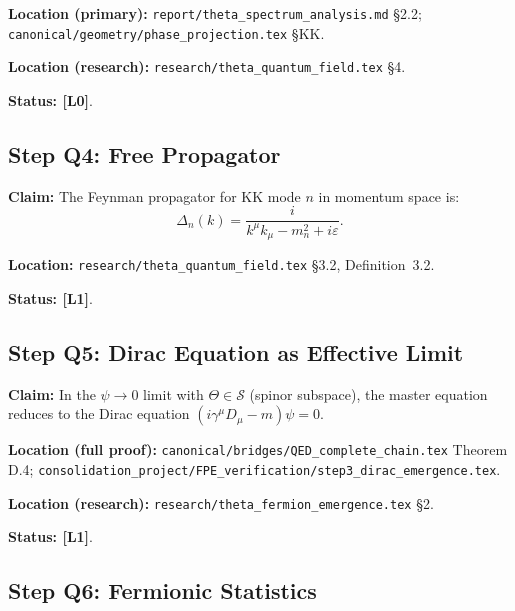 \textbf{Location (primary):} \texttt{report/theta\_spectrum\_analysis.md} §2.2;
\texttt{canonical/geometry/phase\_projection.tex} §KK.

\textbf{Location (research):} \texttt{research/theta\_quantum\_field.tex} §4.

\textbf{Status: [L0]}.

\subsection{Step Q4: Free Propagator}

\textbf{Claim:} The Feynman propagator for KK mode $n$ in momentum space is:
\begin{equation}
  \Delta_n(k) = \frac{i}{k^\mu k_\mu - m_n^2 + i\varepsilon}.
\end{equation}

\textbf{Location:} \texttt{research/theta\_quantum\_field.tex} §3.2,
Definition~3.2.

\textbf{Status: [L1]}.

\subsection{Step Q5: Dirac Equation as Effective Limit}

\textbf{Claim:} In the $\psi\to 0$ limit with $\Theta\in\mathcal{S}$
(spinor subspace), the master equation reduces to the Dirac equation
$(i\gamma^\mu D_\mu - m)\psi = 0$.

\textbf{Location (full proof):}
\texttt{canonical/bridges/QED\_complete\_chain.tex} Theorem D.4;
\texttt{consolidation\_project/FPE\_verification/step3\_dirac\_emergence.tex}.

\textbf{Location (research):} \texttt{research/theta\_fermion\_emergence.tex} §2.

\textbf{Status: [L1]}.

\subsection{Step Q6: Fermionic Statistics}

